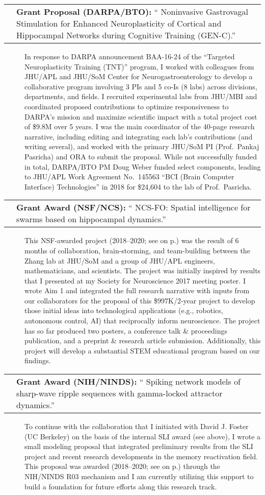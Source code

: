 \documentclass[10pt]{article}
\makeatletter
\newcommand{\unpubtitle}[1]{{\color{hopkinsblue} #1}}
\newcommand{\researchnote}[1]{
  \begin{description}
    \item[] {\hspace{2.2ex}\color{darkgray} #1}
  \end{description}
}
\newcommand{\researchactivity}[4]{
  \begin{minipage}[t]{\textwidth}
    \begin{tabular}{@{\hspace{2ex}}l>{\raggedright\arraybackslash}p{.8\textwidth}}
      \makebox[1.2in][l]{#1} & \textbf{#2:}
      ``\unpubtitle{#3}.'' 
    \end{tabular}
  \researchnote{\hspace{1ex} #4}
  \end{minipage}
  \medbreak
}
\makeatother
\begin{document}
\researchactivity
{April--June 2016}
{Grant Proposal (DARPA/BTO)}
{Noninvasive Gastrovagal Stimulation for Enhanced Neuroplasticity of Cortical
and Hippocampal Networks during Cognitive Training (GEN-C)}
{In response to DARPA announcement BAA-16-24 of the “Targeted Neuroplasticity
  Training (TNT)” program, I worked with colleagues from JHU/APL and JHU/SoM
  Center for Neurogastroenterology to develop a collaborative program involving 3
  PIs and 5 co-Is (8 labs) across divisions, departments, and fields. I recruited
  experimental labs from JHU/MBI and coordinated proposed contributions to
  optimize responsiveness to DARPA’s mission and maximize scientific impact with
  a total project cost of \$9.8M over 5 years. I was the main coordinator of
  the 40-page research narrative, including editing and integrating each lab’s
  contributions (and writing several), and worked with the primary JHU/SoM PI
  (Prof.~Pankaj Pasricha) and ORA to submit the proposal. While not successfully
  funded in total, DARPA/BTO PM Doug Weber funded select components, leading to
  JHU/APL Work Agreement No.~145563 “BCI (Brain Computer Interface) Technologies”
in 2018 for \$24,604 to the lab of Prof.~Pasricha.}

\researchactivity
{Nov. 2017-pres.}
{Grant Award (NSF/NCS)}
{NCS-FO: Spatial intelligence for swarms based on hippocampal dynamics}
{This NSF-awarded project (2018--2020; see \emph{\nameref{sec:cursupport}}
  on p.\pageref{sec:cursupport}) was the result of 6 months of collaboration,
  brain-storming, and team-building between the Zhang lab at JHU/SoM and a group
  of JHU/APL engineers, mathematicians, and scientists. The project was initially
  inspired by results that I presented at my Society for Neuroscience 2017
  meeting poster. I wrote Aim 1 and integrated the full research narrative with
  inputs from our collaborators for the proposal of this \$997K/2-year project to
  develop those initial ideas into technological applications (e.g., robotics,
  autonomous control, AI) that reciprocally inform neuroscience. The project has
  so far produced two posters, a conference talk \& proceedings publication, and
  a preprint \& research article submission. Additionally, this project will
develop a substantial STEM educational program based on our findings.}
\label{sec:resnsf}

\researchactivity
{Jan. 2018-pres.}
{Grant Award (NIH/NINDS)}
{Spiking network models of sharp-wave ripple sequences with gamma-locked
attractor dynamics}
{To continue with the collaboration that I initiated with David J. Foster
  (UC Berkeley) on the basis of the internal SLI award (see above), I wrote
  a small modeling proposal that integrated preliminary results from the SLI
  project and recent research developments in the memory reactivation field.
  This proposal was awarded (2018--2020; see \emph{\nameref{sec:cursupport}}
  on p.\pageref{sec:cursupport}) through the NIH/NINDS R03 mechanism and I am
  currently utilizing this support to build a foundation for future efforts along
this research track.}
\label{sec:resnih}
\end{document}
